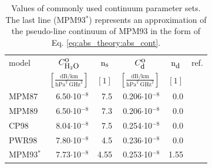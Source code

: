 \begin{table}[!hbt]
  \begin{center}
  \begin{tabular}{lrrrrr}
    \hline
    model  & \multicolumn{1}{c}{$C^{\mbox{\rm o}}_{\mbox{\rm \small H}_{2}\mbox{\rm \small O}}$} & 
             \multicolumn{1}{c}{${\rm n}_{\mbox{\rm \small s}}$}  & 
             \multicolumn{1}{c}{$C^{\mbox{\rm o}}_{\mbox{\rm \small d}}$} & 
             \multicolumn{1}{c}{${\rm n}_{\mbox{\rm \small d}}$}  & 
             ref.\\
           & \multicolumn{1}{c}{$\left[\frac{\mbox{dB/km}}
                               {\mbox{hPa}^2~\mbox{GHz}^2}\right]$} & 
             \multicolumn{1}{c}{$[1]$} & 
             \multicolumn{1}{c}{$\left[\frac{\mbox{dB/km}}
                               {\mbox{hPa}^2~\mbox{GHz}^2}\right]$} & 
             \multicolumn{1}{c}{$[1]$} & \\
    \hline
    MPM87  & 6.50$\cdot$10$^{-8}$ & 7.5 & 0.206$\cdot$10$^{-8}$  &  0.0 & \citet{liebeandlayton:87}\\
    MPM89  & 6.50$\cdot$10$^{-8}$ & 7.3 & 0.206$\cdot$10$^{-8}$  &  0.0 & \citet{liebe:89}\\
    CP98   & 8.04$\cdot$10$^{-8}$ & 7.5 & 0.254$\cdot$10$^{-8}$  &  0.0 & \citet{cruzpol:98}\\ 
    PWR98  & 7.80$\cdot$10$^{-8}$ & 4.5 & 0.236$\cdot$10$^{-8}$  &  0.0 & \citet{pwr:98}\\
    \hline
    MPM93$^*$ & 7.73$\cdot$10$^{-8}$ & 4.55 & 0.253$\cdot$10$^{-8}$  & 1.55 & \citet{liebeetal:93}\\
    \hline
 \end{tabular}
\end{center}
 \caption[Liebe-type continuum model parameters.]{Values of commonly used continuum parameter sets. The last line (MPM93$^*$)
   represents an approximation of the pseudo-line continuum of MPM93
   in the form of Eq. \ref{eq:abs_theory:abs_cont}.}
 \label{tab:wvcontparam}
\end{table}

